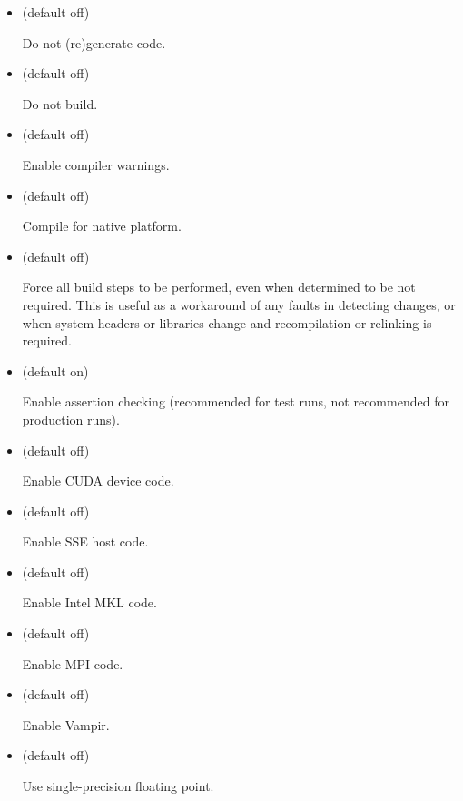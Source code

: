 \begin{itemize}
\item {} (default off)

Do not (re)generate code.

\item {} (default off)

Do not build.

\item {} (default off)

Enable compiler warnings.

\item {} (default off)

Compile for native platform.

\item {} (default off)

Force all build steps to be performed, even when determined to be not
required. This is useful as a workaround of any faults in detecting
changes, or when system headers or libraries change and recompilation or
relinking is required.

\item {} (default on)

Enable assertion checking (recommended for test runs, not recommended for
production runs).

\item {} (default off)

Enable CUDA device code.

\item {} (default off)

Enable SSE host code.

\item {} (default off)

Enable Intel MKL code.

\item {} (default off)

Enable MPI code.

\item {} (default off)

Enable Vampir.

\item {} (default off)

Use single-precision floating point.
\end{itemize}

